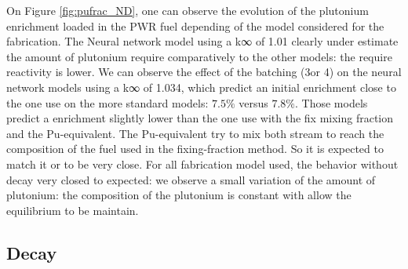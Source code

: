 \documentclass[12pt]{article}
\begin{document}
On Figure \ref{fig:pufrac_ND}, one can observe the evolution of the plutonium
enrichment loaded in the PWR fuel depending of the model considered for the
fabrication.
The Neural network model using a k∞ of 1.01 clearly under estimate the amount of
plutonium require comparatively to the other models: the require reactivity is
lower. We can observe the effect of the batching (3or 4) on the
neural network models using a k∞ of 1.034, which predict an initial enrichment
close to the one use on the more standard models: $7.5\%$ versus $7.8\%$. Those
models predict a enrichment slightly lower than the one use with the fix mixing
fraction and the Pu-equivalent.
The Pu-equivalent try to mix both stream to reach the composition of the fuel
used in the fixing-fraction method. So it is expected to match it or to be very
close.
For all fabrication model used, the behavior without decay very closed to
expected: we observe a small variation of the amount of plutonium: the
composition of the plutonium is constant with allow the equilibrium to be
maintain. 


\subsection{Decay}
\end{document}

